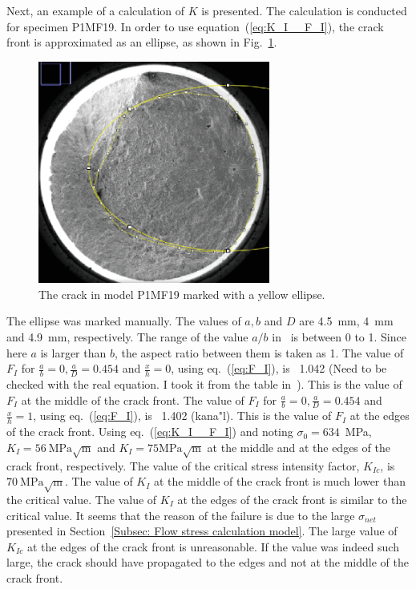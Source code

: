 \documentclass[preprint,12pt]{elsarticle}
\begin{document}
\begin{itemize}
Next, an example of a calculation of $K$ is presented.
The calculation is conducted for specimen P1MF19.
In order to use equation~(\ref{eq:K_I__F_I}), the crack front is approximated as an ellipse, as shown in Fig.~\ref{fig:P1MF19_elip_crack}.
%
\begin{figure}[t!]
  \begin{center}
  \includegraphics[width=3in]{P1MF19_elip_crack.eps}
  \caption{The crack in model P1MF19 marked with a yellow ellipse.}
  \label{fig:P1MF19_elip_crack}
   \end{center}
\end{figure}
%
The ellipse was marked manually.
The values of $a, b$ and $D$ are 4.5~mm, 4~mm and 4.9~mm, respectively.
The range of the value $a/b$ in~\cite{shin2004experimental} is between 0 to 1.
Since here $a$ is larger than $b$, the aspect ratio between them is taken as 1.
The value of $F_I$ for $\frac{a}{b}=0, \frac{a}{D}=0.454$ and $\frac{x}{h}=0$, using eq.~(\ref{eq:F_I}), is ~1.042 (Need to be checked with the real equation. I took it from the table in~\cite{shin2004experimental}).
This is the value of $F_I$ at the middle of the crack front.
The value of $F_I$ for $\frac{a}{b}=0, \frac{a}{D}=0.454$ and $\frac{x}{h}=1$, using eq.~(\ref{eq:F_I}), is ~1.402 (kana"l).
This is the value of $F_I$ at the edges of the crack front.
Using eq.~(\ref{eq:K_I__F_I}) and noting $\sigma_0=634$~MPa, $K_I=56~\mbox{MPa}\sqrt{\mbox{m}}$ and $K_I=75\mbox{MPa}\sqrt{\mbox{m}}$ at the middle and at the edges of the crack front, respectively.
The value of the critical stress intensity factor, $K_{Ic}$, is $70~\mbox{MPa}\sqrt{\mbox{m}}$.
The value of $K_I$ at the middle of the crack front is much lower than the critical value.
The value of $K_I$ at the edges of the crack front is similar to the critical value.
It seems that the reason of the failure is due to the large $\sigma_{net}$ presented in Section~\ref{Subsec: Flow stress calculation model}.
The large value of $K_{Ic}$ at the edges of the crack front is unreasonable.
If the value was indeed such large, the crack should have propagated to the edges and not at the middle of the crack front.




\end{itemize}
\end{document}

